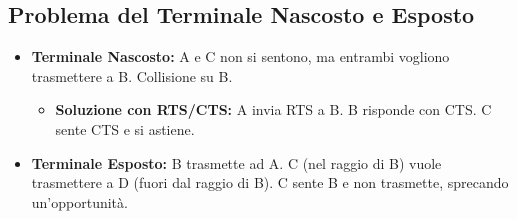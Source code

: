 \documentclass{article}
\begin{document}
\subsection{Problema del Terminale Nascosto e Esposto}
\begin{itemize}
    \item \textbf{Terminale Nascosto:} A e C non si sentono, ma entrambi vogliono trasmettere a B. Collisione su B.
    \begin{itemize}
        \item \textbf{Soluzione con RTS/CTS:} A invia RTS a B. B risponde con CTS. C sente CTS e si astiene.
    \end{itemize}
    \item \textbf{Terminale Esposto:} B trasmette ad A. C (nel raggio di B) vuole trasmettere a D (fuori dal raggio di B). C sente B e non trasmette, sprecando un'opportunità.
\end{itemize}
\end{document}
